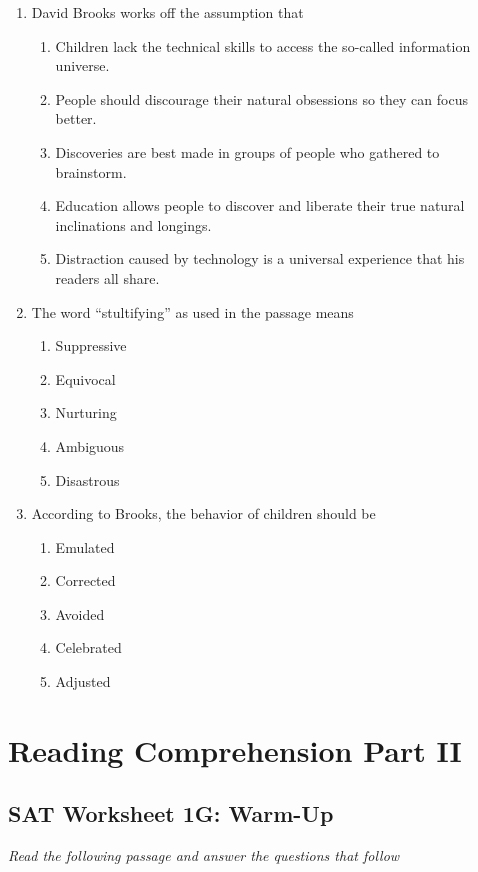 \documentclass[12pt]{book}
\begin{document}
\begin{enumerate}
\item David Brooks works off the assumption that
\begin{enumerate}[label=(\Alph*)]
\item Children lack the technical skills to access the so-called information universe.
\item People should discourage their natural obsessions so they can focus better.
\item Discoveries are best made in groups of people who gathered to brainstorm.
\item Education allows people to discover and liberate their true natural inclinations and longings.
\item Distraction caused by technology is a universal experience that his readers all share.
\end{enumerate}

\bigskip
\item The word “stultifying” as used in the passage means
\begin{enumerate}[label=(\Alph*)]
\item Suppressive
\item Equivocal
\item Nurturing
\item Ambiguous
\item Disastrous
\end{enumerate}

\newpage
\item According to Brooks, the behavior of children should be
\begin{enumerate}[label=(\Alph*)]
\item Emulated
\item Corrected
\item Avoided
\item Celebrated
\item Adjusted
\end{enumerate}
\end{enumerate}

\chapter{Reading Comprehension Part II}
\section{SAT Worksheet 1G: Warm-Up}
\textit{Read the following passage and answer the questions that follow}
\end{document}
